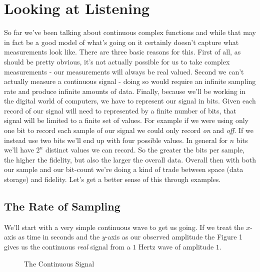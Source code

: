\documentclass[12pt,a6paper]{book}
\begin{document}
\section{Looking at Listening}
So far we've been talking about continuous complex functions and while that may in fact be a good model of what's going on it certainly doesn't capture what measurements look like. There are three basic reasons for this. First of all, as should be pretty obvious, it's not actually possible for us to take complex measurements - our measurements will always be real valued. Second we can't actually measure a continuous signal - doing so would require an infinite sampling rate and produce infinite amounts of data. Finally, because we'll be working in the digital world of computers, we have to represent our signal in bits. Given each record of our signal will need to represented by a finite number of bits, that signal will be limited to a finite set of values. For example if we were using only one bit to record each sample of our signal we could only record \textit{on} and \textit{off}. If we instead use two bits we'll end up with four possible values. In general for $n$ bits we'll have $2^n$ distinct values we can record. So the greater the bits per sample, the higher the fidelity, but also the larger the overall data. Overall then with both our sample and our bit-count we're doing a kind of trade between space (data storage) and fidelity. Let's get a better sense of this through examples.

\subsection{The Rate of Sampling}

We'll start with a very simple continuous wave to get us going. If we treat the $x$-axis as time in seconds and the $y$-axis as our observed amplitude the Figure 1 gives us the continuous \textit{real} signal from a $1$ Hertz wave of amplitude $1$. 

\begin{figure}[!htb]
\caption{\label{fig:my-label} The Continuous Signal}
\end{figure}
\end{document}
